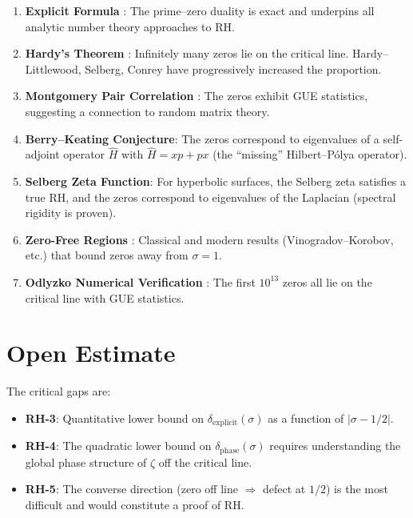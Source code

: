 \documentclass[11pt]{article}
\theoremstyle{definition}
\begin{document}
\begin{enumerate}
  \item \textbf{Explicit Formula} \cite{IK}: The prime--zero duality is exact
    and underpins all analytic number theory approaches to RH.

  \item \textbf{Hardy's Theorem} \cite{Hardy}: Infinitely many zeros lie on the
    critical line.  Hardy--Littlewood, Selberg, Conrey have progressively
    increased the proportion.

  \item \textbf{Montgomery Pair Correlation} \cite{Mont}: The zeros exhibit
    GUE statistics, suggesting a connection to random matrix theory.

  \item \textbf{Berry--Keating Conjecture}: The zeros correspond to eigenvalues
    of a self-adjoint operator $\hat{H}$ with $\hat{H} = xp + px$
    (the ``missing'' Hilbert--P\'olya operator).

  \item \textbf{Selberg Zeta Function}: For hyperbolic surfaces,
    the Selberg zeta satisfies a true RH, and the zeros correspond
    to eigenvalues of the Laplacian (spectral rigidity is proven).

  \item \textbf{Zero-Free Regions} \cite{IK}: Classical and modern results
    (Vinogradov--Korobov, etc.) that bound zeros away from $\sigma = 1$.

  \item \textbf{Odlyzko Numerical Verification} \cite{Odl}: The first
    $10^{13}$ zeros all lie on the critical line with GUE statistics.
\end{enumerate}

\section{Open Estimate}

The critical gaps are:
\begin{itemize}
  \item \textbf{RH-3}: Quantitative lower bound on $\delta_{\mathrm{explicit}}(\sigma)$
    as a function of $|\sigma - 1/2|$.
  \item \textbf{RH-4}: The quadratic lower bound on $\delta_{\mathrm{phase}}(\sigma)$
    requires understanding the global phase structure of $\zeta$ off the critical line.
  \item \textbf{RH-5}: The converse direction (zero off line $\Rightarrow$ defect at $1/2$)
    is the most difficult and would constitute a proof of RH.
\end{itemize}
\end{document}
